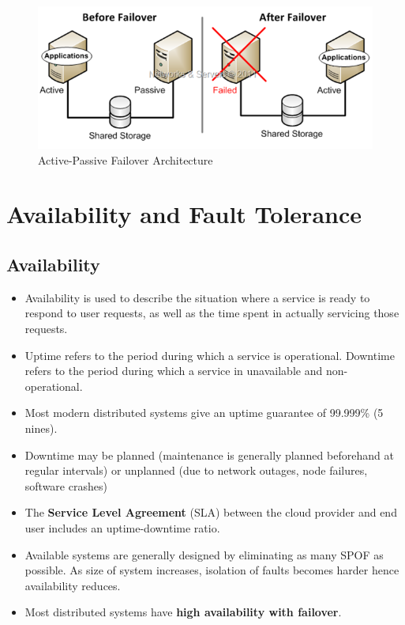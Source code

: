 \documentclass{article}
\begin{document}
\begin{figure}[!ht]
    \centering
    \includegraphics[scale=0.6]{active-passive.png}
    \caption{Active-Passive Failover Architecture}
    \label{fig:my_label_6969}
\end{figure}

\section{Availability and Fault Tolerance}
\subsection{Availability}
\begin{itemize}
    \item Availability is used to describe the situation where a service is ready to respond to user requests, as well as the time spent in actually servicing those requests.
    
    \item Uptime refers to the period during which a service is operational. Downtime refers to the period during which a service in unavailable and non-operational. 
    
    \item Most modern distributed systems give an uptime guarantee of 99.999\% (5 nines).
    
    \item Downtime may be planned (maintenance is generally planned beforehand at regular intervals) or unplanned (due to network outages, node failures, software crashes)
    
    \item The \textbf{Service Level Agreement} (SLA) between the cloud provider and end user includes an uptime-downtime ratio. 
    
    \item Available systems are generally designed by eliminating as many SPOF as possible. As size of system increases, isolation of faults becomes harder hence availability reduces. 
    
    \item Most distributed systems have \textbf{high availability with failover}. 
\end{itemize}
\end{document}
